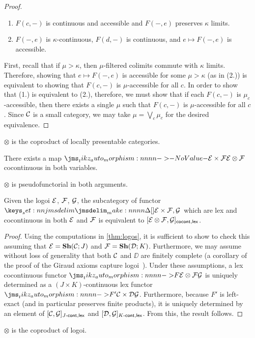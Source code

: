 \documentclass[reqno]{amsart}
\begin{document}
\begin{proof}
  \begin{enumerate}
  \item $F(c,-)$ is continuous and accessible and $F(-,e)$ preserves $\kappa$ limits.
  \item $F(-,e)$ is $\kappa$-continuous, $F(d,-)$ is continuous, and $e \mapsto F(-,e)$ is
    accessible.
  \end{enumerate}
  First, recall that if $\mu > \kappa$, then $\mu$-filtered colimits commute with $\kappa$
  limits. Therefore, showing that $e \mapsto F(-,e)$ is accessible for some $\mu > \kappa$ (as in
  (2.)) is equivalent to showing that $F(c,-)$ is $\mu$-accessible for all $c$. In order to show
  that (1.) is equivalent to (2.), therefore, we must show that if each $F(c,-)$ is
  $\mu_c$-accessible, then there exists a single $\mu$ such that $F(c,-)$ is $\mu$-accessible for
  all $c$. Since $\mathcal{C}$ is a small category, we may take $\mu = \bigvee_{c} \mu_c$ for the desired
  equivalence.
\end{proof}
\begin{corollary}
  $\otimes$ is the coproduct of locally presentable categories.
\end{corollary}
\begin{corollary}
  There exists a map $\Mor{\EE \times \FF}{\EE \otimes \FF}$ cocontinuous in both variables.
\end{corollary}
\begin{corollary}
  $\otimes$ is pseudofunctorial in both arguments.
\end{corollary}

\begin{theorem}
  \label{thm:logos-functorial}
  Given the logoi $\mathcal{E}$, $\mathcal{F}$, $\mathcal{G}$, the subcategory of functor $\Hom{\EE \times \FF}{\GG}$ which
  are lex and cocontinuous in both $\mathcal{E}$ and $\mathcal{F}$ is equivalent to
  $\CoCont{\EE \otimes \FF}{\GG}{lex}$.
\end{theorem}
\begin{proof}
  Using the computations in \cref{thm:logos}, it is sufficient to show to check this assuming that
  $\EE = \SH{\CC}[J]$ and $\FF = \SH{\DD}[K]$. Furthermore, we may assume without loss of generality
  that both $\mathcal{C}$ and $\DD$ are finitely complete (a corollary of the proof of the Giraud axioms
  capture logoi~\parencite{maclane-moerdijk:1992}). Under these assumptions, a lex cocontinuous functor
  $\Mor[F]{\EE \otimes \FF}{\GG}$ is uniquely determined as a $(J \times K)$-continuous lex functor
  $\Mor[F']{\CC \times \DD}{\GG}$. Furthermore, because $F'$ is left-exact (and in particular
  preserves finite products), it is uniquely determined by an element of
  $\Cont[J]{\CC}{\GG}{lex}$ and $\Cont[K]{\DD}{\GG}{lex}$. From this, the result follows.
\end{proof}
\begin{corollary}
  $\otimes$ is the coproduct of logoi.
\end{corollary}

\printbibliography
\end{document}
